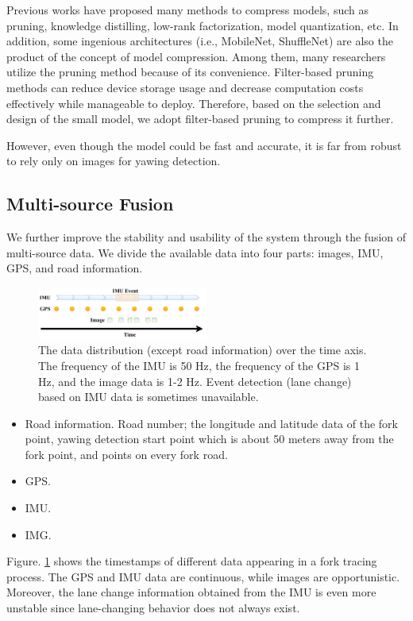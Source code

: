 \documentclass[journal]{IEEEtran}
\begin{document}
Previous works have proposed many methods to compress models, such as pruning, knowledge distilling, low-rank factorization, model quantization, etc. In addition, some ingenious architectures (i.e., MobileNet, ShuffleNet) are also the product of the concept of model compression. Among them, many researchers utilize the pruning method because of its convenience. Filter-based pruning methods can reduce device storage usage and decrease computation costs effectively while manageable to deploy. Therefore, based on the selection and design of the small model, we adopt filter-based pruning to compress it further.

However, even though the model could be fast and accurate, it is far from robust to rely only on images for yawing detection.

\subsection{Multi-source Fusion}
We further improve the stability and usability of the system through the fusion of multi-source data. We divide the available data into four parts: images, IMU, GPS, and road information.

\begin{figure}[htbp]
    \centerline{\includegraphics[width=0.5\textwidth]{fig/data_freq.pdf}}
    \caption{The data distribution (except road information) over the time axis. The frequency of the IMU is 50 Hz, the frequency of the GPS is 1 Hz, and the image data is 1-2 Hz. Event detection (lane change) based on IMU data is sometimes unavailable. }
    \label{fig:data_freq}
\end{figure}
\begin{itemize} 
    \item Road information.
    Road number; the longitude and latitude data of the fork point, yawing detection start point which is about 50 meters away from the fork point,  and points on every fork road.
    \item GPS.
    \item IMU.
    \item IMG.
\end{itemize}

Figure. \ref{fig:data_freq} shows the timestamps of different data appearing in a fork tracing process. The GPS and IMU data are continuous, while images are opportunistic. Moreover, the lane change information obtained from the IMU is even more unstable since lane-changing behavior does not always exist. 
\end{document}
